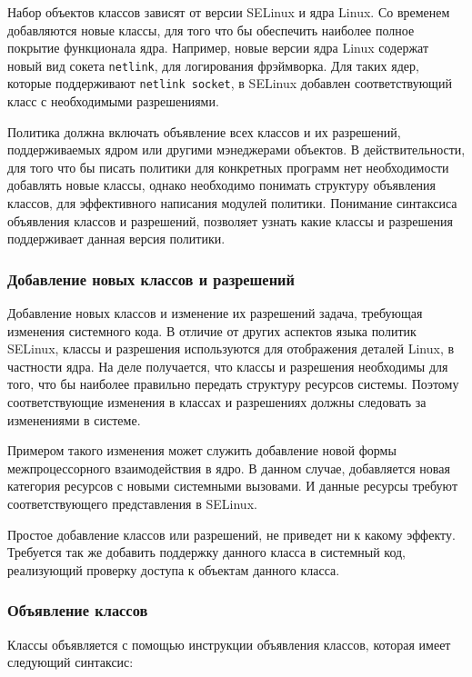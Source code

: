 \documentclass{./../class/UIR}
\begin{document}
	Набор объектов классов зависят от версии SELinux и ядра Linux. Со временем
	добавляются новые классы, для того что бы обеспечить наиболее полное покрытие
	функционала ядра. Например, новые версии ядра Linux содержат новый вид сокета
	\verb"netlink", для логирования фрэймворка. Для таких ядер, которые
	поддерживают \verb"netlink socket", в SELinux добавлен соответствующий класс с
	необходимыми разрешениями.
	
	Политика должна включать объявление всех классов и их разрешений,
	поддерживаемых ядром или другими мэнеджерами объектов. В действительности, для
	того что бы писать политики для конкретных программ нет необходимости
	добавлять новые классы, однако необходимо понимать структуру объявления
	классов, для эффективного написания модулей политики. Понимание синтаксиса
	объявления классов и разрешений, позволяет узнать какие классы и разрешения
	поддерживает данная версия политики.

\subsubsection{Добавление новых классов и разрешений}
    Добавление новых классов и изменение их разрешений задача, требующая
    изменения системного кода. В отличие от других аспектов языка политик
    SELinux, классы и разрешения используются для отображения деталей Linux, в
    частности ядра. На деле получается, что классы и разрешения необходимы для
    того, что бы наиболее правильно передать структуру ресурсов системы. Поэтому
    соответствующие изменения в классах и разрешениях должны следовать за
    изменениями в системе.

    Примером такого изменения может служить добавление новой формы межпроцессорного
    взаимодействия в ядро. В данном случае,  добавляется новая категория ресурсов с
    новыми системными вызовами. И данные ресурсы требуют соответствующего
    представления в SELinux.

    Простое добавление классов или разрешений, не приведет ни к какому эффекту.
    Требуется так же добавить поддержку данного класса в системный код, реализующий
    проверку доступа к объектам данного класса.

\subsubsection{Объявление классов}
    Классы объявляется с помощью инструкции объявления классов, которая имеет
    следующий синтаксис:
\end{document}
